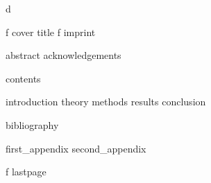 
%

\if\thesisStatus d %
\fi



\if\thesisStatus f
	{cover}
\fi
{}
{title}
\if\thesisStatus f
	{imprint}
\fi

{abstract}
{acknowledgements}

{contents}


{introduction}
{theory}
{methods}
{results}
{conclusion}

{bibliography}

\cleardoublepage
\appendix
{}
{first_appendix}
{second_appendix}

\if\thesisStatus f
	{lastpage}
\fi


